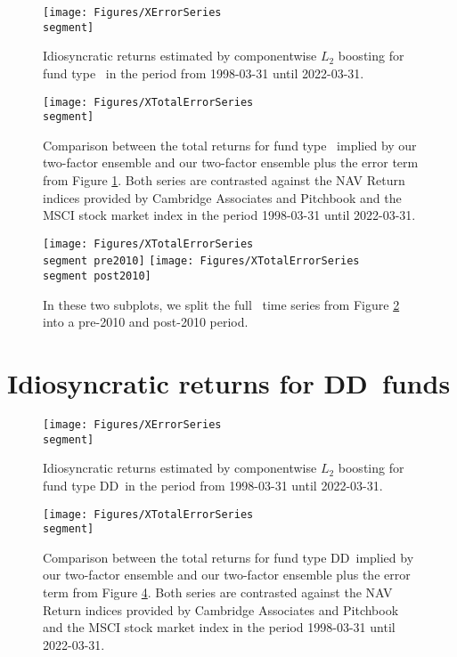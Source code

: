 \begin{figure}[H]
	\centering
	\texttt{[image: Figures/XErrorSeries\\segment]}
	\caption{Idiosyncratic returns estimated by componentwise $L_2$ boosting for fund type \segment \ in the period from 1998-03-31 until 2022-03-31.}
	\label{fig:clb_idio_\segment}
\end{figure}

\begin{figure}[H]
	\centering
	\texttt{[image: Figures/XTotalErrorSeries\\segment]}
	\caption{
		Comparison between the total returns for fund type \segment \ implied by our two-factor ensemble and our two-factor ensemble plus the error term from Figure \ref{fig:clb_idio_\segment}.
		Both series are contrasted against the NAV Return indices provided by Cambridge Associates and Pitchbook and the MSCI stock market index in the period 1998-03-31 until 2022-03-31.
	}
	\label{fig:clb_total_\segment}
\end{figure}

\begin{figure}[H]
	\centering
	\texttt{[image: Figures/XTotalErrorSeries\\segment pre2010]}
	\texttt{[image: Figures/XTotalErrorSeries\\segment post2010]}
	\caption{
		In these two subplots, we split the full \segment \ time series from Figure \ref{fig:clb_total_\segment} into a pre-2010 and post-2010 period.
	}
	\label{fig:clb_pre_post_2010_\segment}
\end{figure}


\renewcommand{\segment}{DD}

\section{Idiosyncratic returns for \segment \ funds}
\label{sec:errors_\segment}

\begin{figure}[H]
	\centering
	\texttt{[image: Figures/XErrorSeries\\segment]}
	\caption{Idiosyncratic returns estimated by componentwise $L_2$ boosting for fund type \segment \ in the period from 1998-03-31 until 2022-03-31.}
	\label{fig:clb_idio_\segment}
\end{figure}

\begin{figure}[H]
	\centering
	\texttt{[image: Figures/XTotalErrorSeries\\segment]}
	\caption{
		Comparison between the total returns for fund type \segment \ implied by our two-factor ensemble and our two-factor ensemble plus the error term from Figure \ref{fig:clb_idio_\segment}.
		Both series are contrasted against the NAV Return indices provided by Cambridge Associates and Pitchbook and the MSCI stock market index in the period 1998-03-31 until 2022-03-31.
	}
	\label{fig:clb_total_\segment}
\end{figure}

